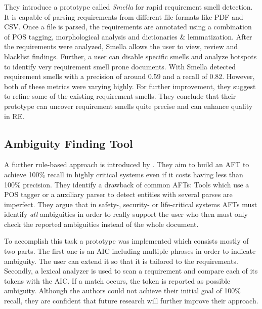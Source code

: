 They introduce a prototype called \textit{Smella} for rapid requirement smell detection.
It is capable of parsing requirements from different file formats like \ac{PDF} and \ac{CSV}.
Once a file is parsed, the requirements are annotated using a combination of \ac{POS} tagging, morphological analysis and dictionaries \& lemmatization.
After the requirements were analyzed, Smella allows the user to view, review and blacklist findings.
Further, a user can disable specific smells and analyze hotspots to identify very requirement smell prone documents.
With Smella \textcite{Femmer:2017} detected requirement smells with a precision of around 0.59 and a recall of 0.82.
However, both of these metrics were varying highly.
For further improvement, they suggest to refine some of the existing requirement smells.
They conclude that their prototype can uncover requirement smells quite precise and can enhance quality in \ac{RE}.

\subsection{Ambiguity Finding Tool}
A further rule-based approach is introduced by \textcite{Tjong:2013}.
They aim to build an \ac{AFT} to achieve 100\% recall in highly critical systems even if it costs having less than 100\% precision.
They identify a drawback of common \acp{AFT}:
Tools which use a \ac{POS} tagger or a auxiliary parser to detect entities with several parses are imperfect.
They argue that in safety-, security- or life-critical systems \acp{AFT} must identify \textit{all} ambiguities in order to really support the user who then must only check the reported ambiguities instead of the whole document.

To accomplish this task a prototype was implemented which consists mostly of two parts.
The first one is an \ac{AIC} including multiple phrases in order to indicate ambiguity.
The user can extend it so that it is tailored to the requirements.
Secondly, a lexical analyzer is used to scan a requirement and compare each of its tokens with the \ac{AIC}.
If a match occurs, the token is reported as possible ambiguity.
Although the authors could not achieve their initial goal of 100\% recall, they are confident that future research will further improve their approach.


